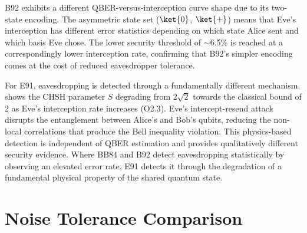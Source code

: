 B92 exhibits a different QBER-versus-interception curve shape due to its two-state encoding. The asymmetric state set ($\ket{0}$, $\ket{+}$) means that Eve's interception has different error statistics depending on which state Alice sent and which basis Eve chose. The lower security threshold of $\sim$6.5\% is reached at a correspondingly lower interception rate, confirming that B92's simpler encoding comes at the cost of reduced eavesdropper tolerance.


For E91, eavesdropping is detected through a fundamentally different mechanism.  shows the CHSH parameter $S$ degrading from $2\sqrt{2}$ towards the classical bound of 2 as Eve's interception rate increases (O2.3). Eve's intercept-resend attack disrupts the entanglement between Alice's and Bob's qubits, reducing the non-local correlations that produce the Bell inequality violation. This physics-based detection is independent of QBER estimation and provides qualitatively different security evidence. Where BB84 and B92 detect eavesdropping statistically by observing an elevated error rate, E91 detects it through the degradation of a fundamental physical property of the shared quantum state.



\section{Noise Tolerance Comparison}


